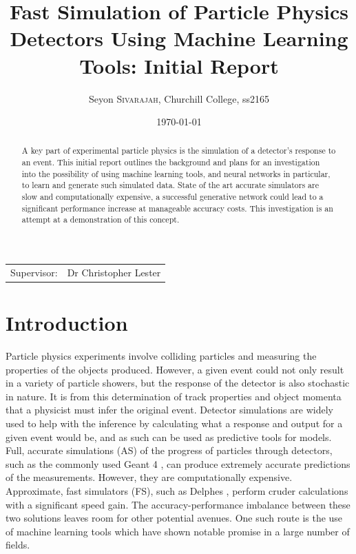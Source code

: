 \documentclass{article}
\title{Fast Simulation of Particle Physics Detectors Using Machine Learning Tools: Initial Report}
\author{Seyon \textsc{Sivarajah}, Churchill College, ss2165}
\date{\today}
\begin{document}
\maketitle


\begin{center}
\begin{tabular}{lr}


Supervisor: & Dr Christopher Lester\\

\end{tabular}
\end{center}



\begin{abstract}
A key part of experimental particle physics is the simulation of a detector's response to an event. This initial report outlines the background and plans for an investigation into the possibility of using machine learning tools, and neural networks in particular, to learn and generate such simulated data. State of the art accurate simulators are slow and computationally expensive, a successful generative network could lead to a significant performance increase at manageable accuracy costs. This investigation is an attempt at a demonstration of this concept.
\end{abstract}

\section{Introduction}

Particle physics experiments involve colliding particles and measuring the properties of the objects produced. However, a given event could not only result in a variety of particle showers, but the response of the detector is also stochastic in nature. It is from this determination of track properties and object momenta that a physicist must infer the original event. Detector simulations are widely used to help with the inference by calculating what a response and output for a given event would be, and as such can be used as predictive tools for models.\\

Full, accurate simulations (AS) of the progress of particles through detectors, such as the commonly used Geant 4 \cite{geant4}, can produce extremely accurate predictions of the measurements. However, they are computationally expensive. Approximate, fast simulators (FS), such as Delphes \cite{delphes}, perform cruder calculations with a significant speed gain. The accuracy-performance imbalance between these two solutions leaves room for other potential avenues. One such route is the use of machine learning tools which have shown notable promise in a large number of fields.\\
\end{document}
